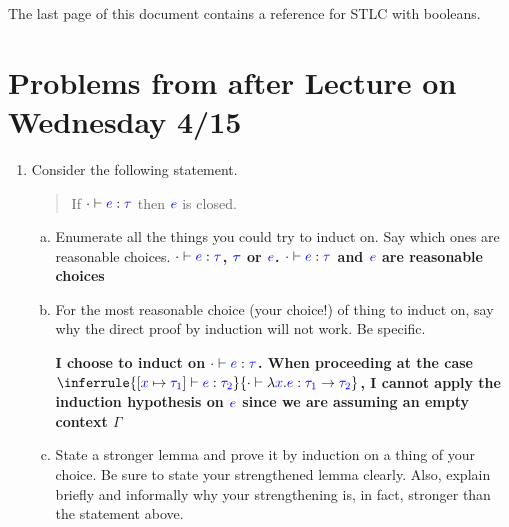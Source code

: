 \documentclass{article}
\newcommand{\meta}[1]{{\color{blue}#1}}
\newcommand{\stlc}{\textsc{STLC}}
\begin{document}
\noindent The last page of this document contains a reference for \stlc{} with booleans.

\section*{Problems from after Lecture on Wednesday 4/15}

\begin{enumerate}[leftmargin=*,itemindent=*,start=1,label={{\bf Problem \arabic*}.},ref=\arabic*]
\item Consider the following statement.
  \begin{quote}
    If $\cdot\vdash\meta{e}:\meta{\tau}$ then $\meta{e}$ is closed.
  \end{quote}
  \begin{enumerate}[(a)]
  \item Enumerate all the things you could try to induct on. Say which ones are reasonable choices. 
    \textbf{$\cdot\vdash\meta{e}:\meta{\tau}$, $\meta{\tau}$ or $\meta{e}$. $\cdot\vdash\meta{e}:\meta{\tau}$ and $\meta{e}$ are reasonable choices}
  \item For the most reasonable choice (your choice!) of thing to induct on, say
    why the direct proof by induction will not work. Be specific.
    
    \textbf{I choose to induct on $\cdot\vdash\meta{e}:\meta{\tau}$. When proceeding at the case $\inferrule{\lbrack \meta{x}\mapsto \meta{\tau_1}\rbrack \vdash \meta{e}:\meta{\tau_2}}{\cdot \vdash\lambda \meta{x}.\meta{e}:\meta{\tau_1}\to\meta{\tau_2}}$, I cannot apply the induction hypothesis on $\meta{e}$ since we are assuming an empty context $\Gamma$}

  \item State a stronger lemma and prove it by induction on a thing of your
    choice. Be sure to state your strengthened lemma clearly. Also, explain
    briefly and informally why your strengthening is, in fact, stronger than the
    statement above.


\end{enumerate}
\end{enumerate}
\end{document}
